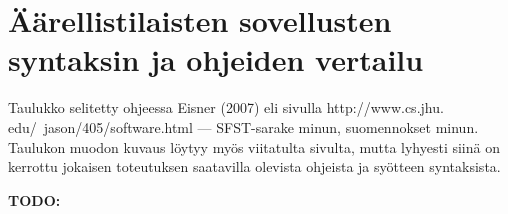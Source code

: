 \documentclass[free]{flammie}
\begin{document}
\section{Äärellistilaisten sovellusten syntaksin ja ohjeiden vertailu}

Taulukko selitetty ohjeessa Eisner (2007) eli sivulla http://www.cs.jhu.
edu/~jason/405/software.html — SFST-sarake minun, suomennokset
minun. Taulukon muodon kuvaus löytyy myös viitatulta sivulta, mutta lyhyesti
siinä on kerrottu jokaisen toteutuksen saatavilla olevista ohjeista ja syötteen syntaksista.

\begin{table}
    \bf TODO:
\end{table}
\end{document}
